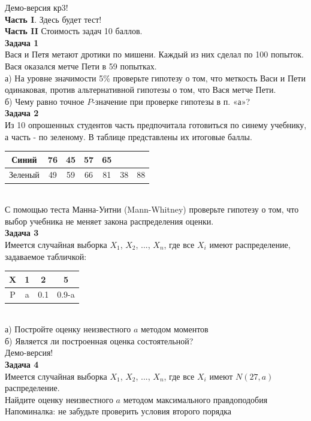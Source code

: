 \documentclass[12pt, a4paper]{article}\usepackage[]{graphicx}\usepackage[]{color}
\begin{document}
Демо-версия кр3! \\
\textbf{Часть I}. Здесь будет тест! \\
\textbf{Часть II} Стоимость задач 10 баллов. \\

\textbf{Задача 1} \\
Вася и Петя метают дротики по мишени. Каждый из них сделал
по 100 попыток. Вася оказался метче Пети в 59 попытках. \\
а) На уровне
значимости 5\% проверьте гипотезу о том, что меткость Васи и Пети
одинаковая, против альтернативной гипотезы о том, что Вася метче
Пети. \\
б) Чему равно точное $P$-значение при проверке гипотезы в п. «а»? \\

\textbf{Задача 2} \\ %
Из 10 опрошенных студентов часть предпочитала готовиться по
синему учебнику, а часть - по зеленому. В таблице представлены их
итоговые баллы.  \\
\begin{tabular}{c|cccccc}
  Синий & 76 & 45 & 57 & 65 &  &  \\
  \hline
  Зеленый & 49 & 59 & 66 & 81 & 38 & 88 \\
\end{tabular} \\
С помощью теста Манна-Уитни (Mann-Whitney) проверьте гипотезу о
том, что выбор учебника не меняет закона распределения оценки. \\

\textbf{Задача 3} \\ %
Имеется случайная выборка $X_{1}$, $X_{2}$, ..., $X_{n}$, где все $X_{i}$ имеют распределение, задаваемое табличкой: \\
\begin{tabular}{c|ccc}
X & 1 & 2 & 5 \\
\hline
P & a & 0.1 & 0.9-a \\
\end{tabular} \\
а) Постройте оценку неизвестного $a$ методом моментов \\
б) Является ли построенная оценка состоятельной? \\

Демо-версия! \\

\textbf{Задача 4} \\ %
Имеется случайная выборка $X_{1}$, $X_{2}$, ..., $X_{n}$, где все $X_{i}$ имеют $N(27,a)$ распределение. \\
Найдите оценку неизвестного $a$ методом максимального правдоподобия \\
Напоминалка: не забудьте проверить условия второго порядка \\
\end{document}
